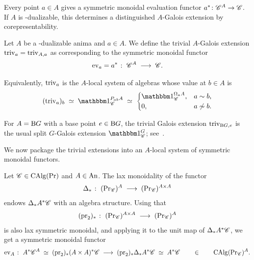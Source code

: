 \documentclass[english,svgnames,table]{article}
\begin{document}
    Every point $a \in A$ gives a symmetric monoidal evaluation functor $a^* \colon \mathscr{C}^A \to \mathscr{C}$. If $A$ is \CO-dualizable, this determines a distinguished $A$-Galois extension by corepresentability.

    \begin{definition}
    \label{def:trivial-Galois}
        Let $A$ be a \CO-dualizable anima and $a \in A$. We define the trivial $A$-Galois extension $\mathrm{triv}_a =\mathrm{triv}_{A,a}$ as corresponding to the symmetric monoidal functor
        \begin{equation*}
            \mathrm{ev}_a = a^* \;\colon\; \mathscr{C}^A \;\longrightarrow\; \mathscr{C}.
        \end{equation*}
    \end{definition}

    \begin{remark}
        Equivalently, $\mathrm{triv}_a$ is the $A$-local system of algebras whose value at $b \in A$ is
        \begin{equation*}
            (\triv_a)_b \;\simeq\; \ounit_{\cC}^{\Path_{ab} A} \;\simeq\; \begin{cases}
                \ounit_{\cC}^{\Omega_a A}, & a \sim b, \\
                0, & a \not\sim b.
            \end{cases}
        \end{equation*}
    \end{remark}

    \begin{example}
        For $A = \mathrm{B} G$ with a base point $e \in \mathrm{B} G$, the trivial Galois extension $\mathrm{triv}_{\mathrm{B} G,e}$ is the usual split $G$-Galois extension $\ounit_{\cC}^G$; see~\cite[\S5.1]{Rognes-2008-Galois}.
    \end{example}
    
    We now package the trivial extensions into an $A$-local system of symmetric monoidal functors.

    \begin{definition}
        Let $\mathscr{C} \in \operatorname{CAlg}(\operatorname{Pr})$ and $A \in \mathrm{An}$. The lax monoidality of the functor 
        \begin{equation*}
            \Delta_* \;\colon\; (\operatorname{Pr}_{\mathscr{C}})^A \;\longrightarrow\; (\operatorname{Pr}_{\mathscr{C}})^{A \times A}
        \end{equation*}
        endows $\Delta_* A^* \mathscr{C}$ with an algebra structure. Using that 
        \begin{equation*}
            (\mathrm{pr}_2)_* \;\colon\; (\operatorname{Pr}_{\mathscr{C}})^{A \times A} \;\longrightarrow\; (\operatorname{Pr}_{\mathscr{C}})^A
        \end{equation*}
        is also lax symmetric monoidal, and applying it to the unit map of $\Delta_* A^* \mathscr{C}$, we get a symmetric monoidal functor
        \begin{equation*}
            \mathrm{ev}_A \;\colon\; A^* \mathscr{C}^A \;\simeq\; (\mathrm{pr}_2)_* (A \times A)^* \mathscr{C} \;\longrightarrow\; (\mathrm{pr}_2)_* \Delta_* A^* \mathscr{C} \;\simeq\; A^* \mathscr{C} \qquad \in \qquad \operatorname{CAlg}(\operatorname{Pr}_{\mathscr{C}})^A.
        \end{equation*}
    \end{definition}
\end{document}
